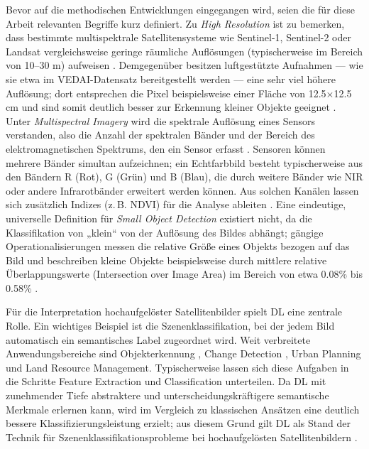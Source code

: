 Bevor auf die methodischen Entwicklungen eingegangen wird, seien die für diese Arbeit relevanten Begriffe kurz definiert. Zu \emph{High Resolution} ist zu bemerken, dass bestimmte multispektrale Satellitensysteme wie Sentinel-1, Sentinel-2 oder Landsat vergleichsweise geringe räumliche Auflösungen (typischerweise im Bereich von 10–30 m) aufweisen \cite{Wieland2023}. Demgegenüber besitzen luftgestützte Aufnahmen — wie sie etwa im \acrlong{VEDAI}-Datensatz bereitgestellt werden — eine sehr viel höhere Auflösung; dort entsprechen die Pixel beispielsweise einer Fläche von 12.5\(\times\)12.5 cm und sind somit deutlich besser zur Erkennung kleiner Objekte geeignet \cite{Razakarivony2015}. Unter \emph{Multispectral Imagery} wird die spektrale Auflösung eines Sensors verstanden, also die Anzahl der spektralen Bänder und der Bereich des elektromagnetischen Spektrums, den ein Sensor erfasst \cite{Khan2018}. Sensoren können mehrere Bänder simultan aufzeichnen; ein Echtfarbbild besteht typischerweise aus den Bändern R (Rot), G (Grün) und B (Blau), die durch weitere Bänder wie \acrfull{NIR} oder andere Infrarotbänder erweitert werden können. Aus solchen Kanälen lassen sich zusätzlich Indizes (z.\,B. \acrshort{NDVI}) für die Analyse ableiten \cite{Wiley2018}. Eine eindeutige, universelle Definition für \emph{Small Object Detection} existiert nicht, da die Klassifikation von „klein“ von der Auflösung des Bildes abhängt; gängige Operationalisierungen messen die relative Größe eines Objekts bezogen auf das Bild und beschreiben kleine Objekte beispielsweise durch mittlere relative Überlappungswerte (Intersection over Image Area) im Bereich von etwa 0.08\% bis 0.58\% \cite{Chen2017}.

Für die Interpretation hochaufgelöster Satellitenbilder spielt \Acrlong{DL} eine zentrale Rolle. Ein wichtiges Beispiel ist die Szenenklassifikation, bei der jedem Bild automatisch ein semantisches Label zugeordnet wird. Weit verbreitete Anwendungsbereiche sind Objekterkennung \cite{Bhagavathy2006,Cheng2016}, Change Detection \cite{Chen2006}, Urban Planning und Land Resource Management. Typischerweise lassen sich diese Aufgaben in die Schritte Feature Extraction und Classification unterteilen. Da \Acrlong{DL} mit zunehmender Tiefe abstraktere und unterscheidungskräftigere semantische Merkmale erlernen kann, wird im Vergleich zu klassischen Ansätzen eine deutlich bessere Klassifizierungsleistung erzielt; aus diesem Grund gilt \Acrlong{DL} als Stand der Technik für Szenenklassifikationsprobleme bei hochaufgelösten Satellitenbildern \cite{Zhu2017}.

